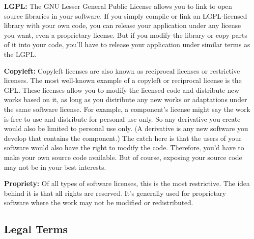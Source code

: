 \begin{flushleft}
	\textbf{LGPL:} The GNU Lesser General Public License allows you to link to open
	source libraries in your software. If you simply compile or link an LGPL-licensed
	library with your own code, you can release your application under any license
	you want, even a proprietary license. But if you modify the library or copy
	parts of it into your code, you'll have to release your application under similar
	terms as the LGPL.
\end{flushleft}

\begin{flushleft}
	\textbf{Copyleft:} Copyleft licenses are also known as reciprocal licenses or
	restrictive licenses. The most well-known example of a copyleft or reciprocal
	license is the GPL. These licenses allow you to modify the licensed code and
	distribute new works based on it, as long as you distribute any new works or
	adaptations under the same software license. For example, a component's license
	might say the work is free to use and distribute for personal use only. So any
	derivative you create would also be limited to personal use only. (A derivative
	is any new software you develop that contains the component.) The catch here is
	that the users of your software would also have the right to modify the code.
	Therefore, you'd have to make your own source code available. But of course,
	exposing your source code may not be in your best interests.
\end{flushleft}

\begin{flushleft}
	\textbf{Propriety:} Of all types of software licenses, this is the most restrictive.
	The idea behind it is that all rights are reserved. It's generally used for
	proprietary software where the work may not be modified or redistributed.
\end{flushleft}

\subsection{Legal Terms}\label{license-legal-terms}

